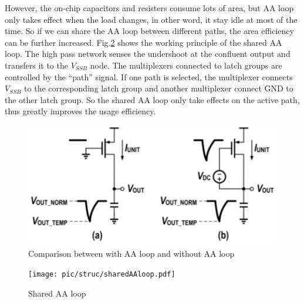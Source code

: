 \documentclass[journal]{IEEEtran}
\begin{document}
However, the on-chip capacitors and resisters consume lots of area, but AA loop only takes effect when the load changes, in other word, it stay idle at most of the time. So if we can share the AA loop between different paths, the area efficiency can be further increased. Fig.\ref{fig:sharedAAloop} shows the working principle of the shared AA loop. The high pass network senses the undershoot at the confluent output and transfers it to the $V_{SSB}$ node. 
The multiplexers connected to latch groups are controlled by the ``path'' signal. If one path is selected, the multiplexer connects $V_{SSB}$ to the corresponding latch group and another multiplexer connect GND to the other latch group. So the shared AA loop only take effects on the active path, thus greatly improves the usage efficiency.
\begin{figure}[t!]
    \centering
    \includegraphics[width=\linewidth]{pic/struc/aaloop.pdf}
    \caption{Comparison between with AA loop and without AA loop}
    \label{fig:aaloop}
\end{figure}
\begin{figure}[t!]
    \centering
    \texttt{[image: pic/struc/sharedAAloop.pdf]}
    \caption{Shared AA loop}
    \label{fig:sharedAAloop}
\end{figure}
\end{document}

